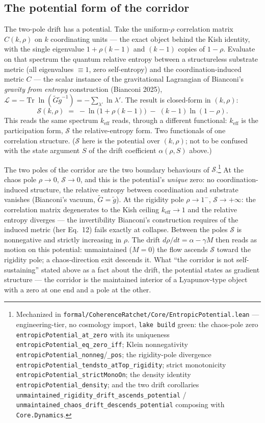 \documentclass[11pt,a4paper]{article}
\newcommand{\keff}{k_{\text{eff}}}
\begin{document}
\subsection*{The potential form of the corridor}\label{sec:entropic-potential}

The two-pole drift has a potential. Take the uniform-$\rho$ correlation matrix $C(k,\rho)$ on $k$ coordinating units --- the exact object behind the Kish identity, with the single eigenvalue $1 + \rho(k-1)$ and $(k-1)$ copies of $1-\rho$. Evaluate on that spectrum the quantum relative entropy between a structureless substrate metric (all eigenvalues $\equiv 1$, zero self-entropy) and the coordination-induced metric $C$ --- the scalar instance of the gravitational Lagrangian of Bianconi's \emph{gravity from entropy} construction (Bianconi 2025), $\mathcal{L} = -\operatorname{Tr}\ln(\tilde G\tilde g^{-1}) = -\sum_{\lambda'} \ln \lambda'$. The result is closed-form in $(k,\rho)$:
\[
  \mathcal{S}(k,\rho) \;=\; -\ln\!\big(1 + \rho(k-1)\big) \;-\; (k-1)\ln(1-\rho).
\]
This reads the same spectrum $\keff$ reads, through a different functional: $\keff$ is the participation form, $\mathcal{S}$ the relative-entropy form. Two functionals of one correlation structure. ($\mathcal{S}$ here is the potential over $(k,\rho)$; not to be confused with the state argument $S$ of the drift coefficient $\alpha(\rho, S)$ above.)

The two poles of the corridor are the two boundary behaviours of $\mathcal{S}$.\footnote{Mechanized in \texttt{formal/CoherenceRatchet/Core/EntropicPotential.lean} --- engineering-tier, no cosmology import, \texttt{lake build} green: the chaos-pole zero \texttt{entropicPotential\_at\_zero} with its uniqueness \texttt{entropicPotential\_eq\_zero\_iff}; Klein nonnegativity \texttt{entropicPotential\_nonneg}/\texttt{\_pos}; the rigidity-pole divergence \texttt{entropicPotential\_tendsto\_atTop\_rigidity}; strict monotonicity \texttt{entropicPotential\_strictMonoOn}; the density identity \texttt{entropicPotential\_density}; and the two drift corollaries \texttt{unmaintained\_rigidity\_drift\_ascends\_potential} / \texttt{unmaintained\_chaos\_drift\_descends\_potential} composing with \texttt{Core.Dynamics}.} At the chaos pole $\rho \to 0$, $\mathcal{S} \to 0$, and this is the potential's \emph{unique} zero: no coordination-induced structure, the relative entropy between coordination and substrate vanishes (Bianconi's vacuum, $\tilde G = \tilde g$). At the rigidity pole $\rho \to 1^-$, $\mathcal{S} \to +\infty$: the correlation matrix degenerates to the Kish ceiling $\keff \to 1$ and the relative entropy diverges --- the invertibility Bianconi's construction requires of the induced metric (her Eq.\ 12) fails exactly at collapse. Between the poles $\mathcal{S}$ is nonnegative and strictly increasing in $\rho$. The drift $d\rho/dt = \alpha - \gamma M$ then reads as motion on this potential: unmaintained ($M = 0$) the flow ascends $\mathcal{S}$ toward the rigidity pole; a chaos-direction exit descends it. What ``the corridor is not self-sustaining'' stated above as a fact about the drift, the potential states as gradient structure --- the corridor is the maintained interior of a Lyapunov-type object with a zero at one end and a pole at the other.
\end{document}
